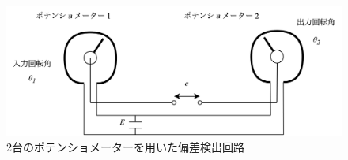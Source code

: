 \begin{figure}
    \centering
    \includegraphics[width=0.8\linewidth]{src/figures/potentio-meter-2/potentio-meter-2.png}
    \caption{2台のポテンショメーターを用いた偏差検出回路}\label{fig:potentio-meter-detection}
\end{figure}
